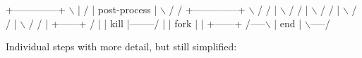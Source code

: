 \begin{DoxyCode}
   +--------------+             \(\backslash\)                 |           /
   | post-process |              \(\backslash\)                /          /
   +--------------+               \(\backslash\)              /          /
           |                       \(\backslash\)            /          /
           |                        \(\backslash\)          /          /
           |                         \(\backslash\)        /          /
           |                          \(\backslash\)      /          /
           |                          +------+         /
           |                          | kill |--------/
           |                          | fork |
           |                          +------+
        /-----\(\backslash\)
        | end |
        \(\backslash\)-----/
\end{DoxyCode}


Individual steps with more detail, but still simplified\+:



